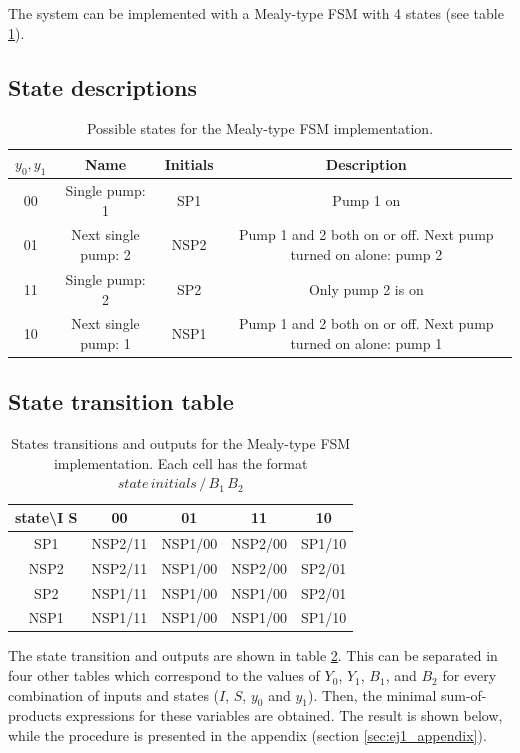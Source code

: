 \documentclass[../../e3_tp3_main.tex]{subfiles}
\begin{document}
The system can be implemented with a Mealy-type FSM with 4 states (see table \ref{tab:ej1_mealy_states}).

\subsection{State descriptions}
\begin{table}[H]	%
	\centering
	\begin{tabular}{|c|c|c|c|}
	\hline	
	$y_0, y_1$ & Name & Initials & Description\\	
	\hline 
	00 & Single pump: 1 &SP1& Pump 1 on\\ 
	\hline 
	01 & Next single pump: 2 &NSP2& Pump 1 and 2 both on or off. Next pump turned on alone: pump 2\\ 
	\hline 
	11 & Single pump: 2 &SP2& Only pump 2 is on\\ 
	\hline 
	10 & Next single pump: 1 &NSP1& Pump 1 and 2 both on or off. Next pump turned on alone: pump 1 \\ 
	\hline 
	\end{tabular} 
	\caption{Possible states for the Mealy-type FSM implementation.}
	\label{tab:ej1_mealy_states}
\end{table}

\subsection{State transition table}
\begin{table}[H]
	\centering
	\begin{tabular}{|c|c|c|c|c|}
		\hline 
		state\textbackslash I S & 00 & 01 & 11 & 10 \\ 
		\hline 
		SP1 & NSP2/11 & NSP1/00 & NSP2/00 & SP1/10 \\ 
		\hline 
		NSP2 & NSP2/11 & NSP1/00 & NSP2/00 & SP2/01 \\ 
		\hline 
		SP2 & NSP1/11 & NSP1/00 & NSP1/00 & SP2/01 \\ 
		\hline 
		NSP1 & NSP1/11 & NSP1/00 & NSP1/00 & SP1/10 \\ 
		\hline 
	\end{tabular} 
	\caption[States transitions and outputs for the Mealy-type FSM implementation]{States transitions and outputs for the Mealy-type FSM implementation. Each cell has the format $state\, initials \,/\, B_1\, B_2$}
	\label{tab:ej1_mealy_transitions}
\end{table}

The state transition and outputs are shown in table \ref{tab:ej1_mealy_transitions}. This can be separated in four other tables which correspond to the values of $Y_0$, $Y_1$, $B_1$, and $B_2$ for every combination of inputs and states ($I$, $S$, $y_0$ and $y_1$). Then, the minimal sum-of-products expressions for these variables are obtained. The result is shown below, while the procedure is presented in the appendix (section \ref{sec:ej1_appendix}). 
\end{document}

